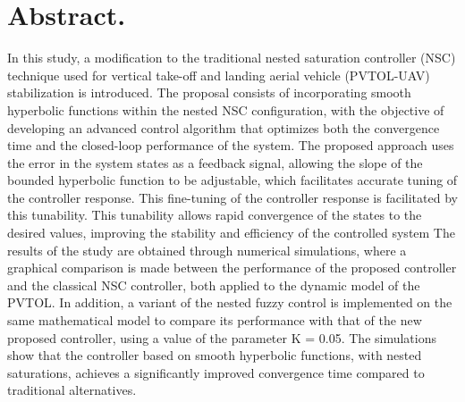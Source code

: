 \section*{Abstract.}

In this study, a modification to the traditional nested saturation controller (NSC) technique used for vertical take-off and landing aerial vehicle (PVTOL-UAV) stabilization is introduced. The proposal consists of incorporating smooth hyperbolic functions within the nested NSC configuration, with the objective of developing an advanced control algorithm that optimizes both the convergence time and the closed-loop performance of the system.
The proposed approach uses the error in the system states as a feedback signal, allowing the slope of the bounded hyperbolic function to be adjustable, which facilitates accurate tuning of the controller response. This fine-tuning of the controller response is facilitated by this tunability. This tunability allows rapid convergence of the states to the desired values, improving the stability and efficiency of the controlled system
The results of the study are obtained through numerical simulations, where a graphical comparison is made between the performance of the proposed controller and the classical NSC controller, both applied to the dynamic model of the PVTOL. In addition, a variant of the nested fuzzy control is implemented on the same mathematical model to compare its performance with that of the new proposed controller, using a value of the parameter K = 0.05. The simulations show that the controller based on smooth hyperbolic functions, with nested saturations, achieves a significantly improved convergence time compared to traditional alternatives.

